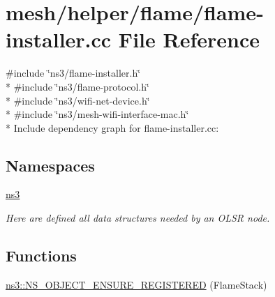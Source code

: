 \hypertarget{flame-installer_8cc}{}\section{mesh/helper/flame/flame-\/installer.cc File Reference}
\label{flame-installer_8cc}
{\ttfamily \#include \char`\"{}ns3/flame-\/installer.\+h\char`\"{}}\\*
{\ttfamily \#include \char`\"{}ns3/flame-\/protocol.\+h\char`\"{}}\\*
{\ttfamily \#include \char`\"{}ns3/wifi-\/net-\/device.\+h\char`\"{}}\\*
{\ttfamily \#include \char`\"{}ns3/mesh-\/wifi-\/interface-\/mac.\+h\char`\"{}}\\*
Include dependency graph for flame-\/installer.cc\+:
\subsection*{Namespaces}
\begin{DoxyCompactItemize}
\item 
 \hyperlink{namespacens3}{ns3}
\begin{DoxyCompactList}\small\item\em Here are defined all data structures needed by an O\+L\+SR node. \end{DoxyCompactList}\end{DoxyCompactItemize}
\subsection*{Functions}
\begin{DoxyCompactItemize}
\item 
\hyperlink{namespacens3_a8bcc945cbcd937d4d27291ae30f5d2c1}{ns3\+::\+N\+S\+\_\+\+O\+B\+J\+E\+C\+T\+\_\+\+E\+N\+S\+U\+R\+E\+\_\+\+R\+E\+G\+I\+S\+T\+E\+R\+ED} (Flame\+Stack)
\end{DoxyCompactItemize}
